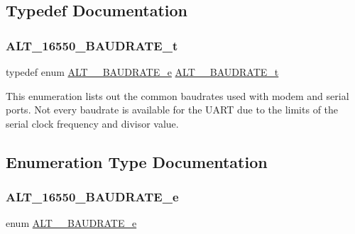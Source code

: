 \subsection{Typedef Documentation}
\mbox{\label{group__UART__BAUD_gaed35f30e7439e47bfaa11ee024f47790}} 
\subsubsection{\texorpdfstring{ALT\_16550\_BAUDRATE\_t}{ALT\_16550\_BAUDRATE\_t}}
{\footnotesize\ttfamily typedef enum \mbox{\hyperlink{group__UART__BAUD_ga037b0f91fcaa13dd341ad8fc6f9cd45f}{A\+L\+T\+\_\+\_\+\+B\+A\+U\+D\+R\+A\+T\+E\+\_\+e}}
 \mbox{\hyperlink{group__UART__BAUD_gaed35f30e7439e47bfaa11ee024f47790}{A\+L\+T\+\_\+\_\+\+B\+A\+U\+D\+R\+A\+T\+E\+\_\+t}}}

This enumeration lists out the common baudrates used with modem and serial ports. Not every baudrate is available for the U\+A\+RT due to the limits of the serial clock frequency and divisor value. 

\subsection{Enumeration Type Documentation}
\mbox{\label{group__UART__BAUD_ga037b0f91fcaa13dd341ad8fc6f9cd45f}} 
\subsubsection{\texorpdfstring{ALT\_16550\_BAUDRATE\_e}{ALT\_16550\_BAUDRATE\_e}}
{\footnotesize\ttfamily enum \mbox{\hyperlink{group__UART__BAUD_ga037b0f91fcaa13dd341ad8fc6f9cd45f}{A\+L\+T\+\_\+\_\+\+B\+A\+U\+D\+R\+A\+T\+E\+\_\+e}}}

